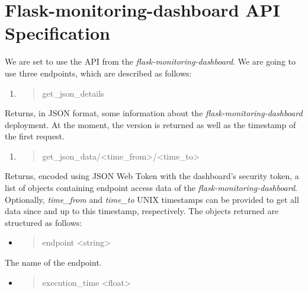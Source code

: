 \hypertarget{flask-monitoring-dashboard-api-specification}{%
\section{Flask-monitoring-dashboard API
Specification}\label{flask-monitoring-dashboard-api-specification}}

We are set to use the API from the \emph{flask-monitoring-dashboard}. We
are going to use three endpoints, which are described as follows:

\begin{enumerate}
\def\labelenumi{\arabic{enumi}.}
\item
  \begin{quote}
  get\_json\_details
  \end{quote}
\end{enumerate}

Returns, in JSON format, some information about the
\emph{flask-monitoring-dashboard} deployment. At the moment, the version
is returned as well as the timestamp of the first request.

\begin{enumerate}
\def\labelenumi{\arabic{enumi}.}
\setcounter{enumi}{1}
\item
  \begin{quote}
  get\_json\_data/\textless{}time\_from\textgreater{}/\textless{}time\_to\textgreater{}
  \end{quote}
\end{enumerate}

Returns, encoded using JSON Web Token with the dashboard's security
token, a list of objects containing endpoint access data of the
\emph{flask-monitoring-dashboard}. Optionally, \emph{time\_from} and
\emph{time\_to} UNIX timestamps can be provided to get all data since
and up to this timestamp, respectively. The objects returned are
structured as follows:

\begin{itemize}
\item
  \begin{quote}
  endpoint \textless{}string\textgreater{}
  \end{quote}
\end{itemize}

The name of the endpoint.

\begin{itemize}
\item
  \begin{quote}
  execution\_time \textless{}float\textgreater{}
  \end{quote}
\end{itemize}

